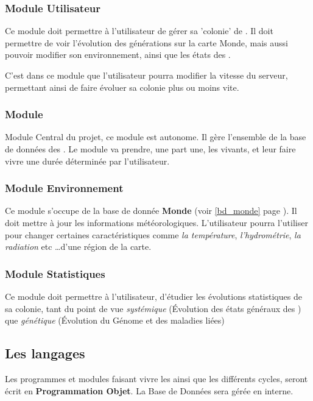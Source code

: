 \documentclass[french]{report}
\begin{document}
\subsubsection{Module Utilisateur}
Ce module doit permettre à l'utilisateur de gérer sa 'colonie' de \CoCiX. Il doit permettre de voir l'évolution des générations sur la carte Monde, mais aussi pouvoir modifier son environnement, ainsi que les états des \CoCiX.

C'est dans ce module que l'utilisateur pourra modifier la vitesse du serveur, permettant ainsi de faire évoluer sa colonie plus ou moins vite.

\subsubsection{Module \CoCiX}
Module Central du projet, ce module est autonome. Il gère l'ensemble de la base de données des \CoCiX. Le module va prendre, une part une, les \CoCiX vivants, et leur faire vivre une durée déterminée par l'utilisateur.
\subsubsection{Module Environnement}
Ce module s'occupe de la base de donnée \textbf{Monde} (voir \ref{bd_monde} page \pageref{bd_monde}). Il doit mettre à jour les informations météorologiques. L'utilisateur pourra l'utiliser pour changer certaines caractéristiques comme \textit{la température}, \textit{l'hydrométrie}, \textit{la radiation} etc \dots d'une région de la carte.

\subsubsection{Module Statistiques}
Ce module doit permettre à l'utilisateur, d'étudier les évolutions statistiques de sa colonie, tant du point de vue \emph{systémique} (Évolution des états généraux des \CoCiX) que \emph{génétique} (Évolution du Génome et des maladies liées)

\subsection{Les langages}
Les programmes et modules faisant vivre les \CoCiX ainsi que les différents cycles, seront écrit en \textbf{Programmation Objet}. La Base de Données sera gérée en interne.

\end{document}
